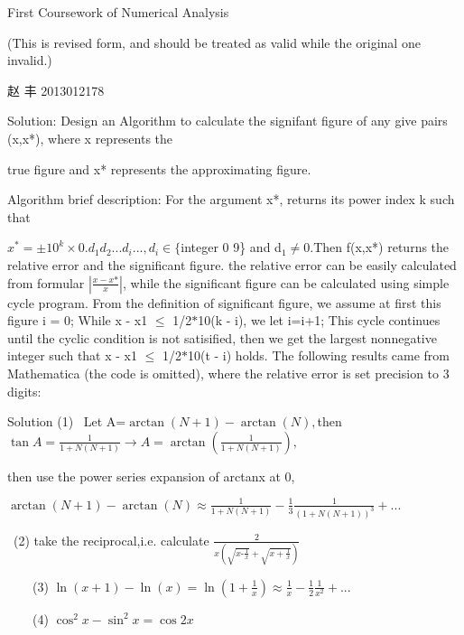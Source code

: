 \documentclass{article}
\begin{document}
\bigskip First Coursework of Numerical Analysis

(This is revised form, and should be treated as valid while the original one
invalid.)

\qquad \qquad \qquad \qquad \qquad \qquad \qquad \qquad \qquad \qquad \qquad
\qquad \qquad \qquad \qquad \qquad \qquad \qquad \qquad \qquad \qquad \qquad
\qquad \qquad \qquad \qquad \qquad \qquad \qquad \qquad \qquad \qquad \qquad
\qquad \qquad \qquad \qquad \qquad \qquad \qquad \qquad \qquad 赵%
丰 2013012178


Solution: Design an Algorithm to calculate the signifant figure of any give
pairs (x,x*), where x represents the 

true figure and x* represents the approximating figure.

Algorithm brief description: For the argument x*, returns its power index k
such that 

$x^{\ast }=\pm 10^{k}\times 0.d_{1}d_{2}...d_{i}...,d_{i}\in \{$integer 0%
9\} and d$_{1}\neq 0.$Then f(x,x*) returns the relative error
and the significant figure.  the relative error can be easily calculated
from formular $|\frac{x-x\textrm{*}}{x}|$, while the significant figure can be
calculated using simple cycle program. From the definition of significant
figure, we assume at first this figure i = 0; While \TEXTsymbol{\vert}x - x1%
\TEXTsymbol{\vert} $\leq $ 1/2$\ast $10(k - i), we let i=i+1;
This cycle continues until the cyclic condition is not satisified, then we
get the largest nonnegative integer such that \TEXTsymbol{\vert}x - x1%
\TEXTsymbol{\vert} $\leq $ 1/2$\ast $10(t - i) holds. The
following results came from Mathematica (the code is omitted), where the
relative error is set precision to 3 digits:


Solution (1) \ Let A=$\arctan
(N+1)-\arctan (N),$then $\tan A=\frac{1}{1+N(N+1)}\rightarrow A=\arctan (%
\frac{1}{1+N(N+1)}),$

\qquad \qquad \qquad then use the power series expansion of arctanx at 0,

\qquad \qquad \qquad $\arctan (N+1)-\arctan (N)\approx \frac{1}{1+N(N+1)}-%
\frac{1}{3}\frac{1}{(1+N(N+1))^{3}}+...$

\qquad \qquad\ (2) take the reciprocal,i.e. calculate $\frac{2}{x(\sqrt{x%
\textrm{-}\frac{1}{x}}+\sqrt{x+\frac{1}{x}})}$

\ \ \ \ (3) $\ln (x+1)-\ln (x)=\ln (1+\frac{1}{x})\approx \frac{1}{x}-\frac{1%
}{2}\frac{1}{x^{2}}+...$

\ \ \ \ (4) $\cos ^{2}x-\sin ^{2}x=\cos 2x$
\end{document}
